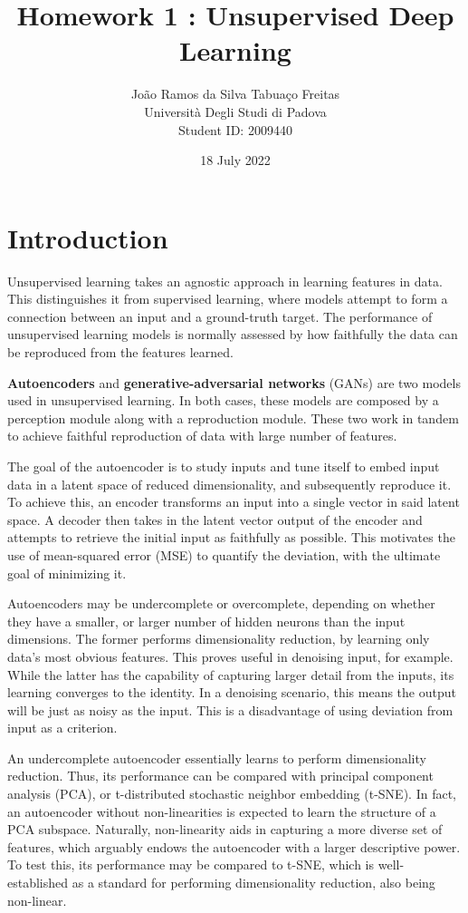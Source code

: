 \documentclass[11pt]{article} %
\title{Homework 1 : Unsupervised Deep Learning}
\author{João Ramos da Silva Tabuaço Freitas \\ Università Degli Studi di Padova \\ Student ID: 2009440}
\date{18 July 2022} %
\begin{document}
\maketitle

\section*{\centering Introduction}
Unsupervised learning takes an agnostic approach in learning features in data. This distinguishes it from supervised learning, where models attempt to form a connection between an input and a ground-truth target. The performance of unsupervised learning models is normally assessed by how faithfully the data can be reproduced from the features learned.

\textbf{Autoencoders} and \textbf{generative-adversarial networks} (GANs) are two models used in unsupervised learning. In both cases, these models are composed by a perception module along with a reproduction module. These two work in tandem to achieve faithful reproduction of data with large number of features.

\noindent The goal of the autoencoder is to study inputs and tune itself to embed input data in a latent space of reduced dimensionality, and subsequently reproduce it. To achieve this, an encoder transforms an input into a single vector in said latent space. A decoder then takes in the latent vector output of the encoder and attempts to retrieve the initial input as faithfully as possible. This motivates the use of mean-squared error (MSE) to quantify the deviation, with the ultimate goal of minimizing it.

\noindent Autoencoders may be undercomplete or overcomplete, depending on whether they have a smaller, or larger number of hidden neurons than the input dimensions. The former performs dimensionality reduction, by learning only data's most obvious features. This proves useful in denoising input, for example. While the latter has the capability of capturing larger detail from the inputs, its learning converges to the identity. In a denoising scenario, this means the output will be just as noisy as the input. This is a disadvantage of using deviation from input as a criterion.

\noindent An undercomplete autoencoder essentially learns to perform dimensionality reduction. Thus, its performance can be compared with principal component analysis (PCA), or t-distributed stochastic neighbor embedding (t-SNE). In fact, an autoencoder without non-linearities is expected to learn the structure of a PCA subspace. Naturally, non-linearity aids in capturing a more diverse set of features, which arguably endows the autoencoder with a larger descriptive power. To test this, its performance may be compared to t-SNE, which is well-established as a standard for performing dimensionality reduction, also being non-linear.
\end{document}
